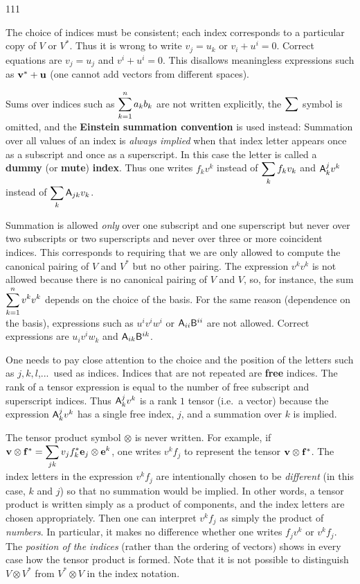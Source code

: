 \begin{dinglist}{111}
\item The choice of indices must be consistent; each index corresponds to
a particular copy of $V$ or $V^{*}$. Thus it is wrong to write $v_{j}=u_{k}$
or $v_{i}+u^{i}=0$. Correct equations are $v_{j}=u_{j}$ and $v^{i}+u^{i}=0$.
This disallows meaningless expressions such as $\mathbf{ v}^{*}+\mathbf{ u}$
(one cannot add vectors from different spaces).
\item Sums over indices such as $\displaystyle\sum_{k=1}^{n}a_{k}b_{k}$ are not written
explicitly, the $\displaystyle\sum$ symbol is omitted, and the \textbf{Einstein
summation convention} is used instead: Summation over all values of
an index is \emph{always implied} when that index letter appears once
as a subscript and once as a superscript. In this case the letter
is called a \textbf{dummy} (or \textbf{mute})
\textbf{index}. Thus one writes $f_{k}v^{k}$ instead of $\displaystyle\sum_{k}f_{k}v_{k}$
and $\mathsf{A}_{k}^{j}v^{k}$ instead of $\displaystyle\sum_{k}\mathsf{A}_{jk}v_{k}$. 
\item Summation is allowed \emph{only} over one subscript and one superscript
but never over two subscripts or two superscripts and never over three
or more coincident indices. This corresponds to requiring that we
are only allowed to compute the canonical pairing of $V$ and $V^{*}$
but no other pairing. The expression
$v^{k}v^{k}$ is not allowed because there is no canonical pairing
of $V$ and $V$, so, for instance, the sum $\displaystyle\sum_{k=1}^{n}v^{k}v^{k}$
depends on the choice of the basis. For the same reason (dependence
on the basis), expressions such as $u^{i}v^{i}w^{i}$ or $\mathsf{A}_{ii}\mathsf{B}^{ii}$
are not allowed. Correct expressions are $u_{i}v^{i}w_{k}$ and $\mathsf{A}_{ik}\mathsf{B}^{ik}$.
\item One needs to pay close attention to the choice and the position of
the letters such as $j,k,l$,...~used as indices. Indices that are
not repeated are \textbf{free} indices. The rank
of a tensor expression is equal to the number of free subscript and
superscript indices. Thus $\mathsf{A}_{k}^{j}v^{k}$ is a rank $1$ tensor
(i.e.~a vector) because the expression $\mathsf{A}_{k}^{j}v^{k}$ has a single
free index, $j$, and a summation over $k$ is implied. 
\item The tensor product symbol $\otimes$ is never written. For example,
if $\mathbf{ v}\otimes\mathbf{ f}^{*}=\displaystyle\sum_{jk}v_{j}f_{k}^{*}\mathbf{ e}_{j}\otimes\mathbf{ e}^{k}$,
one writes $v^{k}f_{j}$ to represent the tensor $\mathbf{ v}\otimes\mathbf{ f}^{*}$.
The index letters in the expression $v^{k}f_{j}$ are intentionally
chosen to be \emph{different} (in this case, $k$ and $j$) so that
no summation would be implied. In other words, a tensor product is
written simply as a product of components, and the index letters are
chosen appropriately. Then one can interpret $v^{k}f_{j}$ as simply
the product of \emph{numbers}. In particular, it makes no difference
whether one writes $f_{j}v^{k}$ or $v^{k}f_{j}$. The \emph{position
of the indices} (rather than the ordering of vectors) shows in every
case how the tensor product is formed. Note that it is not possible
to distinguish $V\otimes V^{*}$ from $V^{*}\otimes V$ in the index
notation.

\end{dinglist}

